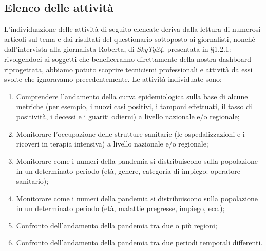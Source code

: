 \subsection{Elenco delle attività}
L'individuazione delle attività di seguito elencate deriva dalla lettura di numerosi articoli sul tema e dai risultati del questionario sottoposto ai giornalisti, nonché dall'intervista alla giornalista Roberta, di \textit{SkyTg24}, presentata in §1.2.1: rivolgendoci ai soggetti che beneficeranno direttamente della nostra dashboard riprogettata, abbiamo potuto scoprire tecnicismi professionali e attività da essi svolte che ignoravamo precedentemente.
\noindent
Le attività individuate sono:
\begin{enumerate}
    \item Comprendere l'andamento della curva epidemiologica sulla base di alcune metriche (per esempio, i nuovi casi positivi, i tamponi effettuati, il tasso di positività, i decessi e i guariti odierni) a livello nazionale e/o regionale;\label{itm:1}
    \item Monitorare l'occupazione delle strutture sanitarie (le ospedalizzazioni e i ricoveri in terapia intensiva) a livello nazionale e/o regionale;\label{itm:2}
    \item Monitorare come i numeri della pandemia si distribuiscono sulla popolazione in un determinato periodo (età, genere, categoria di impiego: operatore sanitario);\label{itm:3}
    \item Monitorare come i numeri della pandemia si distribuiscono sulla popolazione in un determinato periodo (età, malattie pregresse, impiego, ecc.);\label{itm:4}
    \item Confronto dell'andamento della pandemia tra due o più regioni;\label{itm:5}
    \item Confronto dell'andamento della pandemia tra due periodi temporali differenti.\label{itm:6}
\end{enumerate}

